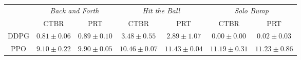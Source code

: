\begin{tabular}{ccccccc}
\toprule
 & \multicolumn{2}{c}{\textit{Back and Forth}} & \multicolumn{2}{c}{\textit{Hit the Ball}} & \multicolumn{2}{c}{\textit{Solo Bump}} \\
       & CTBR & PRT & CTBR & PRT & CTBR & PRT \\
\midrule
DDPG &  $0.81 \pm 0.06$ &  $0.89 \pm 0.10$  & $3.48 \pm 0.55$ & $2.89 \pm 1.07$ & $0.00 \pm 0.00$ & $0.02 \pm 0.03$ \\
PPO  & $\bm{9.10 \pm 0.22}$ & $\bm{9.90 \pm 0.05}$  & $\bm{10.46 \pm 0.07}$ & $\bm{11.43 \pm 0.04}$  & $\bm{11.19 \pm 0.31}$ & $\bm{11.23 \pm 0.86}$  \\
\bottomrule 
\end{tabular}
